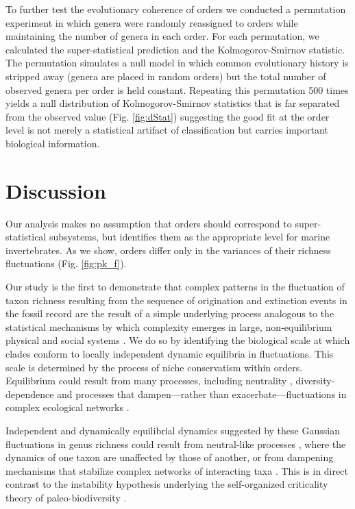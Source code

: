 \documentclass[12pt]{article}
\let\citep=\cite
\begin{document}
To further test the evolutionary coherence of orders we conducted a
permutation experiment in which genera were randomly reassigned to
orders while maintaining the number of genera in each order. For each
permutation, we calculated the super-statistical prediction and the
Kolmogorov-Smirnov statistic. The permutation simulates a null model
in which common evolutionary history is stripped away (genera are
placed in random orders) but the total number of observed genera per
order is held constant.  Repeating this permutation 500 times yields a
null distribution of Kolmogorov-Smirnov statistics that is far
separated from the observed value (Fig. \ref{fig:dStat}) suggesting
the good fit at the order level is not merely a statistical artifact
of classification but carries important biological information.

\section*{Discussion}

Our analysis makes no assumption that orders should correspond to
super-statistical subsystems, but identifies them as the appropriate
level for marine invertebrates. As we show, orders differ only in the
variances of their richness fluctuations (Fig. \ref{fig:pk_f}).

Our study is the first to demonstrate that complex patterns in the
fluctuation of taxon richness resulting from the sequence of origination
and extinction events in the fossil record are the result of a simple
underlying process analogous to the statistical mechanisms by which
complexity emerges in large, non-equilibrium physical \citep{beck2004}
and social systems \citep{fuentes2009}.  We do so by identifying the
biological scale at which clades conform to locally independent
dynamic equilibria in fluctuations. This scale is determined by the
process of niche conservatism \citep{roy2009range, hopkins2014} within
orders.  Equilibrium could result from many processes, including
neutrality \citep{macWilson, hubbell2001}, diversity-dependence
\citep{gavrilets2005, rabosky2009ecolLett} and processes that
dampen---rather than exacerbate---fluctuations in complex ecological
networks \citep{berlow2009}. 

Independent and dynamically equilibrial dynamics suggested by these
Gaussian fluctuations in genus richness could result from neutral-like
processes \citep{hubbell2001}, where the dynamics of one taxon are
unaffected by those of another, or from dampening mechanisms that
stabilize complex networks of interacting taxa \citep{brose2005}. This
is in direct contrast to the instability hypothesis underlying the
self-organized criticality theory of paleo-biodiversity
\citep{bak1993, sole1997}.
\end{document}
